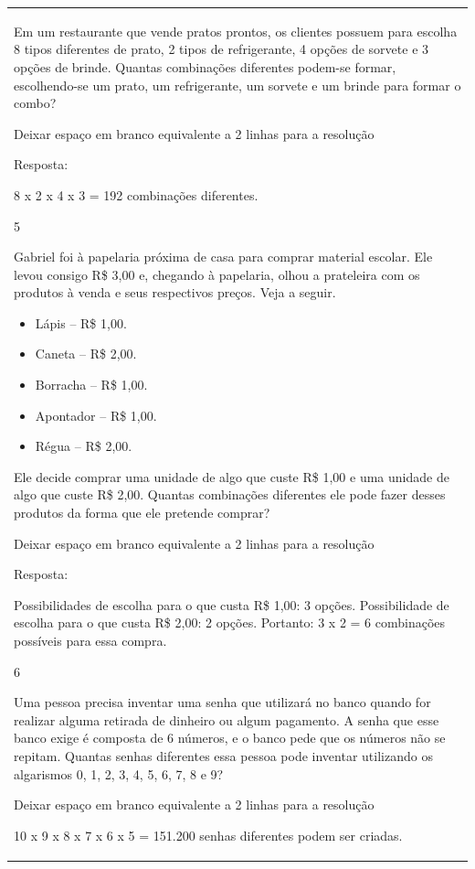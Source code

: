 \begin{mdframed}[linewidth=2pt,linecolor=salmao,roundcorner=2pt]
\begin{escolha}
{{{\begin{longtable}[]{@{}l@{}}
\begin{itemize}
{Em um restaurante que vende pratos prontos, os clientes possuem para
escolha 8 tipos diferentes de prato, 2 tipos de refrigerante, 4 opções
de sorvete e 3 opções de brinde. Quantas combinações diferentes podem-se
formar, escolhendo-se um prato, um refrigerante, um sorvete e um brinde para
formar o combo?

Deixar espaço em branco equivalente a 2 linhas para a resolução

Resposta:

8 x 2 x 4 x 3 = 192 combinações diferentes.

\num{5}

Gabriel foi à papelaria próxima de casa para comprar material
escolar. Ele levou consigo R\$ 3,00 e, chegando à papelaria, olhou a
prateleira com os produtos à venda e seus respectivos preços. Veja a seguir.

\begin{itemize}
  \item Lápis -- R\$ 1,00.
  \item Caneta -- R\$ 2,00.
  \item Borracha -- R\$ 1,00.
  \item Apontador -- R\$ 1,00.
  \item Régua -- R\$ 2,00.
\end{itemize}

Ele decide comprar uma unidade de algo que custe R\$ 1,00 e uma unidade de
algo que custe R\$ 2,00. Quantas combinações diferentes ele pode fazer
desses produtos da forma que ele pretende comprar?

Deixar espaço em branco equivalente a 2 linhas para a resolução

Resposta:

Possibilidades de escolha para o que custa R\$ 1,00: 3 opções.
Possibilidade de escolha para o que custa R\$ 2,00: 2 opções.
Portanto: 3 x 2 = 6 combinações possíveis para essa compra.

\num{6}

Uma pessoa precisa inventar uma senha que utilizará no banco quando for
realizar alguma retirada de dinheiro ou algum pagamento. A senha que esse
banco exige é composta de 6 números, e o banco pede que os números
não se repitam. Quantas senhas diferentes essa pessoa pode inventar
utilizando os algarismos 0, 1, 2, 3, 4, 5, 6, 7, 8 e 9?

Deixar espaço em branco equivalente a 2 linhas para a resolução

10 x 9 x 8 x 7 x 6 x 5 = 151.200 senhas diferentes podem ser criadas.

}
\end{itemize}
\end{longtable}}}}
\end{escolha}
\end{mdframed}
